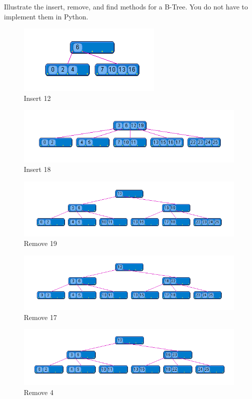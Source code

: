 \begin{problem}
Illustrate the insert, remove, and find methods for a B-Tree.  You do not have to implement them in Python.

\begin{figure}[H]
\includegraphics[width=.5\textwidth]{3.png} \\
Insert 12
\end{figure}

\begin{figure}[H]
\includegraphics[width=\textwidth]{8.png}
Insert 18
\end{figure}

\begin{figure}[H]
\includegraphics[width=\textwidth]{10.png}
Remove 19
\end{figure}

\begin{figure}[H]
\includegraphics[width=\textwidth]{11.png}
Remove 17
\end{figure}

\begin{figure}[H]
\includegraphics[width=\textwidth]{12.png}
Remove 4
\end{figure}

\end{problem}
